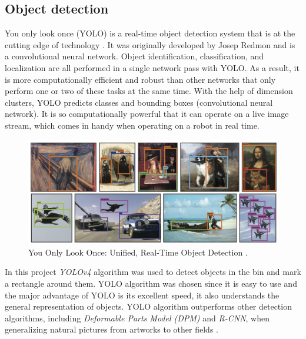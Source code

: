 \subsection{Object detection}\label{sec:yolo}
You only look once (YOLO) is a real-time object detection system that is at the cutting edge of technology \cite{redmon_yolov3_2018}. 
It was originally developed by Josep Redmon and is a convolutional neural network.
Object identification, classification, and localization are all performed in a single network pass with YOLO. 
As a result, it is more computationally efficient and robust than other networks that only perform one or two of these tasks at the same time. 
With the help of dimension clusters, YOLO predicts classes and bounding boxes (convolutional neural network). 
It is so computationally powerful that it can operate on a live image stream, which comes in handy when operating on a robot in real time.
\begin{figure} [ht]
 \centering
 \includegraphics[width = 0.75 \textwidth]{graphics/yolo.PNG}
 \caption{You Only Look Once: Unified, Real-Time Object Detection \cite{redmon_you_2016}.}
 \label{fig:yolo}
\end{figure}


In this project \textit{YOLOv4} \cite{bochkovskiy_yolov4_2020} algorithm was used to detect objects in the bin and mark a rectangle around them. 
YOLO algorithm was chosen since it is easy to use and the major advantage of YOLO is its excellent speed, it also understands the general representation of objects. YOLO algorithm outperforms other detection algorithms, including \textit{Deformable Parts Model (DPM)} and \textit{R-CNN}, when generalizing natural pictures from artworks to other fields \cite{zou_object_2019}.



